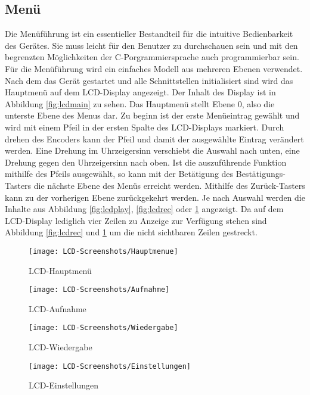 \subsection{Menü}
Die Menüführung ist ein essentieller Bestandteil für die intuitive Bedienbarkeit des Gerätes. Sie muss leicht für den Benutzer zu durchschauen sein und mit den begrenzten Möglichkeiten der C-Porgrammiersprache auch programmierbar sein. Für die Menüführung wird ein einfaches Modell aus mehreren Ebenen verwendet. Nach dem das Gerät gestartet und alle Schnittstellen initialisiert sind wird das Hauptmenü auf dem LCD-Display angezeigt. Der Inhalt des Display ist in Abbildung \ref{fig:lcdmain} zu sehen. Das Hauptmenü stellt Ebene 0, also die unterste Ebene des Menus dar. Zu beginn ist der erste Menüeintrag gewählt und wird mit einem Pfeil in der ersten Spalte des LCD-Displays markiert. Durch drehen des Encoders kann der Pfeil und damit der ausgewählte Eintrag verändert werden. Eine Drehung im Uhrzeigersinn verschiebt die Auswahl nach unten, eine Drehung gegen den Uhrzeigersinn nach oben. Ist die auszuführende Funktion mithilfe des Pfeils ausgewählt, so kann mit der Betätigung des Bestätigungs-Tasters die nächste Ebene des Menüs erreicht werden. Mithilfe des Zurück-Tasters kann zu der vorherigen Ebene zurückgekehrt werden. Je nach Auswahl werden die Inhalte aus Abbildung \ref{fig:lcdplay}, \ref{fig:lcdrec} oder \ref{fig:lcdset} angezeigt. Da auf dem LCD-Display lediglich vier Zeilen zu Anzeige zur Verfügung stehen sind Abbildung \ref{fig:lcdrec} und \ref{fig:lcdset} um die nicht sichtbaren Zeilen gestreckt. 
\begin{figure}[h]
	\begin{minipage}{.22\linewidth}
		\centering
		\texttt{[image: LCD-Screenshots/Hauptmenue]}
		\caption{LCD-Hauptmenü}
		\label{fig:lcdmain}
	\end{minipage}
	\hfill
	\begin{minipage}{.22\linewidth}
		\centering
		\texttt{[image: LCD-Screenshots/Aufnahme]}
		\caption{LCD-Aufnahme}
		\label{fig:lcdrec}
	\end{minipage}
	\hfill
	\begin{minipage}{.22\linewidth}
		\centering
		\texttt{[image: LCD-Screenshots/Wiedergabe]}
		\caption{LCD-Wiedergabe}
		\label{fig:lcdplay}
	\end{minipage}
	\hfill
	\begin{minipage}{.22\linewidth}
		\centering
		\texttt{[image: LCD-Screenshots/Einstellungen]}
		\caption{LCD-Einstellungen}
		\label{fig:lcdset}
	\end{minipage}
\end{figure}
